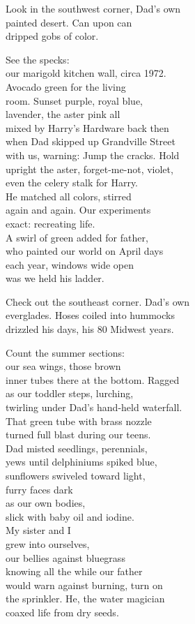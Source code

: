 \documentclass[twoside,10pt]{book}
\begin{document}
Look in the southwest corner, Dad's own\\
painted desert. Can upon can\\
dripped gobs of color.

See the specks:\\
our marigold kitchen wall, circa 1972.\\
Avocado green for the living\\
room. Sunset purple, royal blue,\\
lavender, the aster pink all\\
mixed by Harry's Hardware back then\\
when Dad skipped up Grandville Street\\
with us, warning: Jump the cracks. Hold\\
upright the aster, forget-me-not, violet,\\
even the celery stalk for Harry.\\
He matched all colors, stirred\\
again and again. Our experiments\\
exact: recreating life.\\
A swirl of green added for father,\\
who painted our world on April days\\
each year, windows wide open\\
was we held his ladder.

Check out the southeast corner. Dad's own\\
everglades. Hoses coiled into hummocks\\
drizzled his days, his 80 Midwest years.

Count the summer sections:\\
our sea wings, those brown\\
inner tubes there at the bottom. Ragged\\
as our toddler steps, lurching,\\
twirling under Dad's hand-held waterfall.\\
That green tube with brass nozzle\\
turned full blast during our teens.\\
Dad misted seedlings, perennials,\\
yews until delphiniums spiked blue,\\
sunflowers swiveled toward light,\\
furry faces dark\\
as our own bodies,\\
slick with baby oil and iodine.\\
My sister and I\\
grew into ourselves,\\
our bellies against bluegrass\\
knowing all the while our father\\
would warn against burning, turn on\\
the sprinkler. He, the water magician\\
coaxed life from dry seeds.
\end{document}
